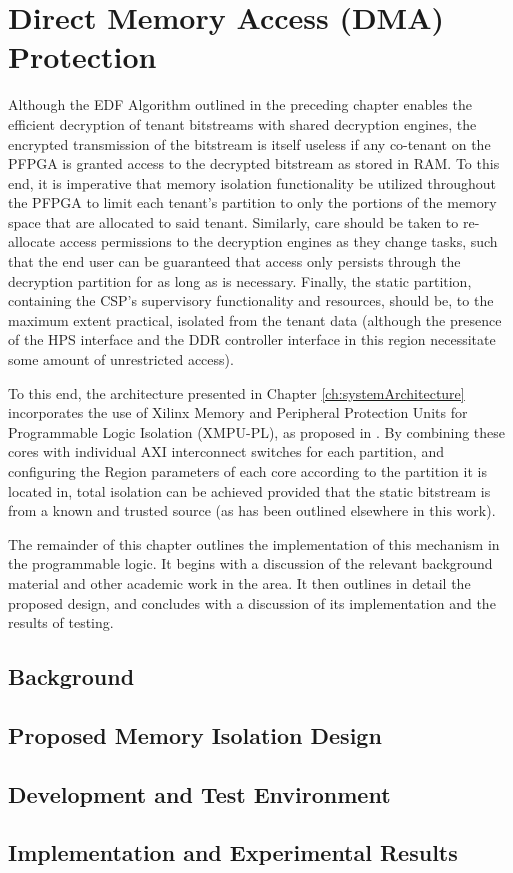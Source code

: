 
\chapter{Direct Memory Access (DMA) Protection}\label{ch:dmaProtection}
Although the EDF Algorithm outlined in the preceding chapter enables the efficient decryption of tenant bitstreams with shared decryption engines, the encrypted transmission of the bitstream is itself useless if any co-tenant on the PFPGA is granted access to the decrypted bitstream as stored in RAM. To this end, it is imperative that memory isolation functionality be utilized throughout the PFPGA to limit each tenant's partition to only the portions of the memory space that are allocated to said tenant. Similarly, care should be taken to re-allocate access permissions to the decryption engines as they change tasks, such that the end user can be guaranteed that access only persists through the decryption partition for as long as is necessary. Finally, the static partition, containing the CSP's supervisory functionality and resources, should be, to the maximum extent practical, isolated from the tenant data (although the presence of the HPS interface and the DDR controller interface in this region necessitate some amount of unrestricted access).

To this end, the architecture presented in Chapter \ref{ch:systemArchitecture} incorporates the use of Xilinx Memory and Peripheral Protection Units for Programmable Logic Isolation (XMPU-PL), as proposed in \cite{noauthor_memory_2021}. By combining these cores with individual AXI interconnect switches for each partition, and configuring the Region parameters of each core according to the partition it is located in, total isolation can be achieved provided that the static bitstream is from a known and trusted source (as has been outlined elsewhere in this work).

The remainder of this chapter outlines the implementation of this mechanism in the programmable logic. It begins with a discussion of the relevant background material and other academic work in the area. It then outlines in detail the proposed design, and concludes with a discussion of its implementation and the results of testing.

\section{Background}\label{sec:DMABackground}

\section{Proposed Memory Isolation Design}\label{sec:DMADesign}

\section{Development and Test Environment}\label{sec:DMAEnvironment}

\section{Implementation and Experimental Results}\label{sec:DMAResults}